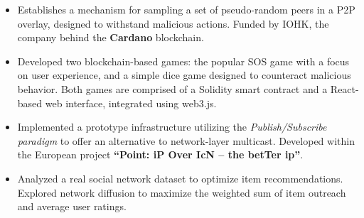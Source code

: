 \documentclass[10pt,a4paper,ragged2e,withhyper]{altacv}
\begin{document}
\begin{paracol}{2}
        \hfill

            \begin{itemize}
                \item[] Establishes a mechanism for sampling a set of pseudo-random peers in a P2P overlay, designed to withstand malicious actions. Funded by IOHK, the company behind the \textbf{Cardano} blockchain.
            \end{itemize}
            \divider
        
            \begin{itemize}
                \item[] Developed two blockchain-based games: the popular SOS game with a focus on user experience, and a simple dice game designed to counteract malicious behavior. Both games are comprised of a Solidity smart contract and a React-based web interface, integrated using web3.js.
            \end{itemize}
            \divider

            \begin{itemize}
                \item[] Implemented a prototype infrastructure utilizing the \emph{Publish/Subscribe paradigm} to offer an alternative to network-layer multicast. Developed within the European project \textbf{``Point: iP Over IcN – the betTer ip''}.
            \end{itemize}
            \divider

            \begin{itemize}
                \item[] Analyzed a real social network dataset to optimize item recommendations. Explored network diffusion to maximize the weighted sum of item outreach and average user ratings.
            \end{itemize}
    \end{paracol}
\end{document}
